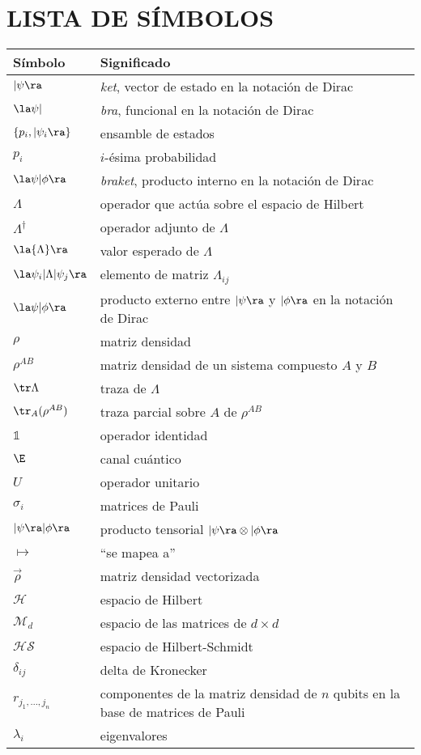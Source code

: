 


\chapter{LISTA DE SÍMBOLOS}

\begin{longtable}{@{}l@{\extracolsep{\fill}} p{4.75in} @{}}  %
  \textsf{Símbolo} & \textsf{Significado}\\[12pt]
  \endhead{}
 $|\psi\ra$ &  \textit{ket}, vector de estado en la notación de Dirac \\
  $\la\psi|$ & \textit{bra}, funcional en la notación de Dirac\\
  $\{p_i,|\psi_i\ra\}$ & ensamble de estados \\
  $p_i$ & $i$-ésima probabilidad\\
  $\la\psi|\phi\ra$ & \textit{braket}, producto interno en la notación de Dirac\\
  $\Lambda$ &  operador que actúa sobre el espacio de Hilbert\\
  $\Lambda^{\dagger}$ & operador adjunto de $\Lambda$\\
  $\la{\Lambda}\ra$ & valor esperado de $\Lambda$\\
  $\la\psi_i|\Lambda|\psi_j\ra$ & elemento de matriz $\Lambda_{ij}$\\
  $\la \psi|\phi \ra $ & producto externo entre $|\psi\ra$ y $|\phi\ra$ en la notación de Dirac \\
  $\rho$ & matriz densidad\\
  $\rho^{AB}$ & matriz densidad de un sistema compuesto $A$ y $B$\\
  $\tr \Lambda$ & traza de $\Lambda$\\
  $\tr_{A}(\rho^{AB})$ & traza parcial sobre $A$ de $\rho^{AB}$\\
  $\mathds{1}$ & operador identidad \\
  $\E$ & canal cuántico \\
  $U$ & operador unitario \\
  $\sigma_i$ & matrices de Pauli\\
  $| \psi\ra|\phi\ra$ & producto tensorial $|\psi\ra\otimes|\phi\ra$\\
  $\mapsto$ & ``se mapea a''\\
  $\vec\rho$ & matriz densidad vectorizada\\
  $\mathcal{H}$ & espacio de Hilbert\\
  $\mathcal{M}_d$ & espacio de las matrices de $d\times d$\\
  $\mathcal{HS}$ & espacio de Hilbert-Schmidt\\
  $\delta_{ij}$ & delta de Kronecker\\
  $r_{j_1,\ldots,j_n}$ & componentes de la matriz densidad de $n$ qubits en la base de matrices de Pauli \\
 $\lambda_i$ & eigenvalores
\end{longtable}
